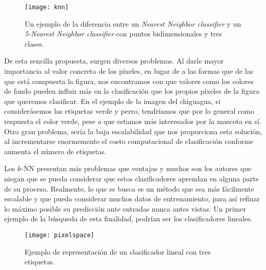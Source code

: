 \begin{figure}[htpb]
  \centering
  \texttt{[image: knn]}
  \caption{Un ejemplo de la diferencia entre un \emph{Nearest Neighbor classifier} y un \emph{5-Nearest Neighbor classifier} con puntos bidimensionales y tres clases.}
  \label{fig:knn}
\end{figure}

De esta sencilla propuesta, surgen diversos problemas. Al darle mayor importancia al valor concreto de los píxeles, en lugar de a las formas que de las que está compuesta la figura, nos encontramos con que valores como los colores de fondo pueden influir más en la clasificación que los propios píxeles de la figura que queremos clasificar. En el ejemplo de la imagen del chiguagua, si considerásemos las etiquetas verde y perro, tendríamos que por lo general como respuesta el color verde, pese a que estamos más interesados por la mascota en sí. Otro gran problema, sería la baja escalabilidad que nos proporciona esta solución, al incrementarse enormemente el costo computacional de clasificación conforme aumenta el número de etiquetas.\newline


Los $k$-NN presentan más problemas que ventajas y muchos son los autores que niegan que se pueda considerar que estos clasificadores aprendan en alguna parte de su proceso. Realmente, lo que se busca es un método que sea más fácilmente escalable y que pueda considerar muchos datos de entrenamiento, para así refinar lo máximo posible su predicción ante entradas nunca antes vistas. Un primer ejemplo de la búsqueda de esta finalidad, podrían ser los clasificadores lineales.\\

\begin{figure}[htpb]
  \centering
  \texttt{[image: pixelspace]}
  \caption{Ejemplo de representación de un clasificador lineal con tres etiquetas.}
  \label{fig:pixelspace}
\end{figure}


